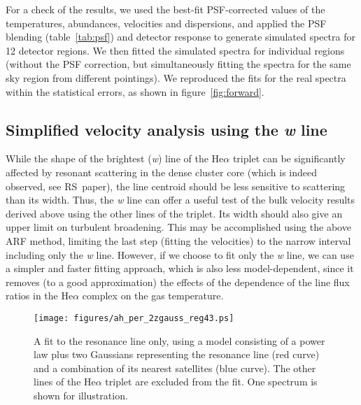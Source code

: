 For a check of the results, we used the best-fit PSF-corrected values of the temperatures, abundances, velocities and dispersions, and applied the PSF blending (table~\ref{tab:psf}) and detector response to generate simulated spectra for 12 detector regions. We then fitted the simulated spectra for individual regions (without the PSF correction, but simultaneously fitting the spectra for the same sky region from different pointings). We reproduced the fits for the real spectra within the statistical errors, as shown in figure~\ref{fig:forward}.

\subsection{Simplified velocity analysis using the {\it w}\/ line}
\label{sec:maxim}

While the shape of the brightest ({\it w}) line of the He$\alpha$ triplet can be significantly affected by resonant scattering in the dense cluster core (which is indeed observed, see RS~paper), the line centroid should be less sensitive to scattering than its width. Thus, the {\it w} line can offer a useful test of the bulk velocity results derived above using the other lines of the triplet. Its width should also give an upper limit on turbulent broadening. This may be accomplished using the above ARF method, limiting the last step (fitting the velocities) to the narrow interval including only the {\it w} line. However, if we choose to fit only the {\it w} line, we can use a simpler and faster fitting approach, which is also less model-dependent, since it removes (to a good approximation) the effects of the dependence of the line flux ratios in the He$\alpha$ complex on the gas temperature.

\begin{figure*}
 \begin{center}
  \texttt{[image: figures/ah\_per\_2zgauss\_reg43.ps]}
 \end{center}  
 \vspace{15mm}
 \caption{A fit to the resonance line only, using a model consisting of a power law plus two Gaussians representing the resonance line (red curve) and a combination of its nearest satellites (blue curve). The other lines of the He$\alpha$ triplet are excluded from the fit. One spectrum is shown for illustration.}
 \label{fig:2gausreg43}
\end{figure*}

